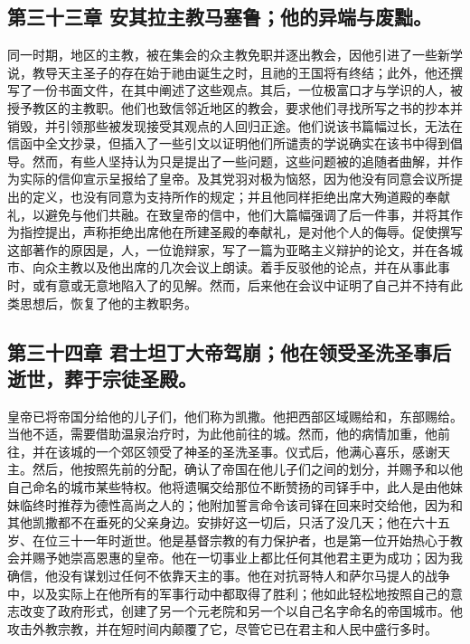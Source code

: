 \subsection{第三十三章 安其拉主教马塞鲁；他的异端与废黜。}

同一时期，地区的主教，被在集会的众主教免职并逐出教会，因他引进了一些新学说，教导天主圣子的存在始于祂由诞生之时，且祂的王国将有终结；此外，他还撰写了一份书面文件，在其中阐述了这些观点。其后，一位极富口才与学识的人，被授予教区的主教职。他们也致信邻近地区的教会，要求他们寻找所写之书的抄本并销毁，并引领那些被发现接受其观点的人回归正途。他们说该书篇幅过长，无法在信函中全文抄录，但插入了一些引文以证明他们所谴责的学说确实在该书中得到倡导。然而，有些人坚持认为只是提出了一些问题，这些问题被的追随者曲解，并作为实际的信仰宣示呈报给了皇帝。及其党羽对极为恼怒，因为他没有同意会议所提出的定义，也没有同意为支持所作的规定；并且他同样拒绝出席大殉道殿的奉献礼，以避免与他们共融。在致皇帝的信中，他们大篇幅强调了后一件事，并将其作为指控提出，声称拒绝出席他在所建圣殿的奉献礼，是对他个人的侮辱。促使撰写这部著作的原因是，人，一位诡辩家，写了一篇为亚略主义辩护的论文，并在各城市、向众主教以及他出席的几次会议上朗读。着手反驳他的论点，并在从事此事时，或有意或无意地陷入了的见解。然而，后来他在会议中证明了自己并不持有此类思想后，恢复了他的主教职务。\par


\subsection{第三十四章 君士坦丁大帝驾崩；他在领受圣洗圣事后逝世，葬于宗徒圣殿。}

皇帝已将帝国分给他的儿子们，他们称为凯撒。他把西部区域赐给和，东部赐给。当他不适，需要借助温泉治疗时，为此他前往的城。然而，他的病情加重，他前往，并在该城的一个郊区领受了神圣的圣洗圣事。仪式后，他满心喜乐，感谢天主。然后，他按照先前的分配，确认了帝国在他儿子们之间的划分，并赐予和以他自己命名的城市某些特权。他将遗嘱交给那位不断赞扬的司铎手中，此人是由他妹妹临终时推荐为德性高尚之人的；他附加誓言命令该司铎在回来时交给他，因为和其他凯撒都不在垂死的父亲身边。安排好这一切后，只活了没几天；他在六十五岁、在位三十一年时逝世。他是基督宗教的有力保护者，也是第一位开始热心于教会并赐予她崇高恩惠的皇帝。他在一切事业上都比任何其他君主更为成功；因为我确信，他没有谋划过任何不依靠天主的事。他在对抗哥特人和萨尔马提人的战争中，以及实际上在他所有的军事行动中都取得了胜利；他如此轻松地按照自己的意志改变了政府形式，创建了另一个元老院和另一个以自己名字命名的帝国城市。他攻击外教宗教，并在短时间内颠覆了它，尽管它已在君主和人民中盛行多时。\par

